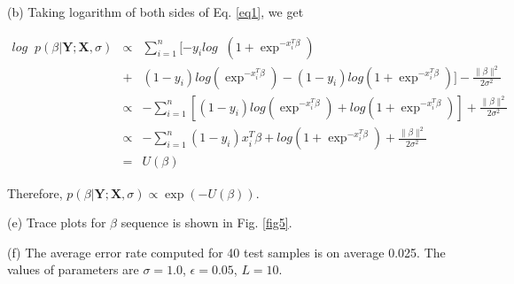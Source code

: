 \documentclass[11pt]{article}
\newcommand{\XB}{\mathbf{X}}
\newcommand{\YB}{\mathbf{Y}}
\begin{document}
\par (b) Taking logarithm of both sides of Eq. \ref{eq1}, we get 

\begin{eqnarray*}
 log \; \; p( \beta | \YB; \XB, \sigma) &\propto&  \sum_{i=1}^{n} [ -y_i log \; \; (1+\exp^{-x_{i}^{T}\beta} ) \\ 
&+& (1-y_i) log(\exp^{-x_{i}^{T}\beta}) - (1-y_i) log(1+\exp^{-x_{i}^{T}\beta} ) ] - \frac{\| \beta \|^2}{2\sigma^2} \\
&\propto&  - \sum_{i=1}^{n} [(1-y_i) log(\exp^{-x_{i}^{T}\beta}) + log(1+\exp^{-x_{i}^{T}\beta})]+ \frac{\| \beta \|^2}{2\sigma^2}  \\
&\propto& -\sum_{i=1}^{n} (1-y_i)x_{i}^{T}\beta + log(1+\exp^{-x_{i}^{T}\beta}) + \frac{\| \beta \|^2}{2\sigma^2}  \\
&=& U(\beta)
\end{eqnarray*}

Therefore, $p( \beta | \YB; \XB, \sigma) \propto \exp{(-U(\beta))}$.

\par (e) Trace plots for $\beta$ sequence is shown in Fig. \ref{fig5}.

\par (f) The average error rate computed for 40 test samples is on average 0.025.  The values of parameters are $\sigma = 1.0$, $\epsilon = 0.05$, $L = 10$.
\end{document}
